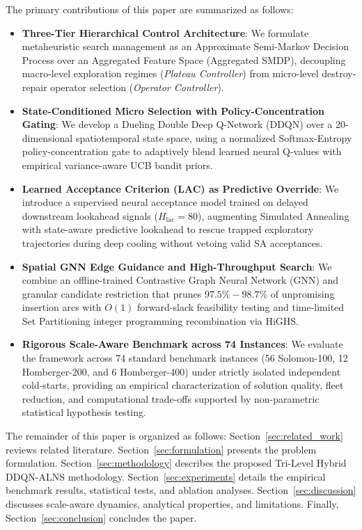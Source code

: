\documentclass{ieeeaccess}
\begin{document}
The primary contributions of this paper are summarized as follows:
\begin{itemize}\setlength{\itemsep}{0pt}\setlength{\parskip}{0pt}
    \item \textbf{Three-Tier Hierarchical Control Architecture}: We formulate metaheuristic search management as an Approximate Semi-Markov Decision Process over an Aggregated Feature Space (Aggregated SMDP), decoupling macro-level exploration regimes (\emph{Plateau Controller}) from micro-level destroy-repair operator selection (\emph{Operator Controller}).
    \item \textbf{State-Conditioned Micro Selection with Policy-Concentration Gating}: We develop a Dueling Double Deep Q-Network (DDQN) over a 20-dimensional spatiotemporal state space, using a normalized Softmax-Entropy policy-concentration gate to adaptively blend learned neural Q-values with empirical variance-aware UCB bandit priors.
    \item \textbf{Learned Acceptance Criterion (LAC) as Predictive Override}: We introduce a supervised neural acceptance model trained on delayed downstream lookahead signals ($H_{\text{lac}}=80$), augmenting Simulated Annealing with state-aware predictive lookahead to rescue trapped exploratory trajectories during deep cooling without vetoing valid SA acceptances.
    \item \textbf{Spatial GNN Edge Guidance and High-Throughput Search}: We combine an offline-trained Contrastive Graph Neural Network (GNN) and granular candidate restriction that prunes $97.5\%-98.7\%$ of unpromising insertion arcs with $O(1)$ forward-slack feasibility testing and time-limited Set Partitioning integer programming recombination via HiGHS.
    \item \textbf{Rigorous Scale-Aware Benchmark across 74 Instances}: We evaluate the framework across 74 standard benchmark instances (56 Solomon-100, 12 Homberger-200, and 6 Homberger-400) under strictly isolated independent cold-starts, providing an empirical characterization of solution quality, fleet reduction, and computational trade-offs supported by non-parametric statistical hypothesis testing.
\end{itemize}

The remainder of this paper is organized as follows: Section~\ref{sec:related_work} reviews related literature. Section~\ref{sec:formulation} presents the problem formulation. Section~\ref{sec:methodology} describes the proposed Tri-Level Hybrid DDQN-ALNS methodology. Section~\ref{sec:experiments} details the empirical benchmark results, statistical tests, and ablation analyses. Section~\ref{sec:discussion} discusses scale-aware dynamics, analytical properties, and limitations. Finally, Section~\ref{sec:conclusion} concludes the paper.
\end{document}
